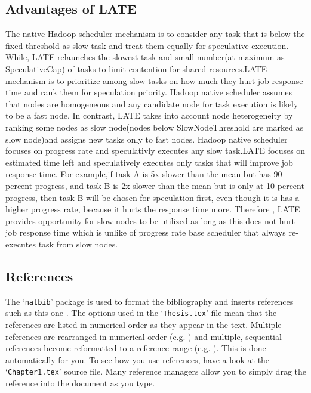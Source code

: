 \subsection{Advantages of LATE}

The native Hadoop scheduler mechanism is to consider any task that is below the fixed threshold as slow task and treat them equally for speculative execution. While, LATE relaunches the slowest task and small number(at maximum as SpeculativeCap) of tasks to limit contention for shared resources.LATE mechanism is to prioritize among slow tasks on how much they hurt job response time and rank them for speculation priority.
Hadoop native scheduler assumes that nodes are homogeneous and any candidate node for task execution is likely to be a fast node. In contrast, LATE takes into account node heterogeneity by ranking some nodes as slow node(nodes below SlowNodeThreshold are marked as slow node)and assigns new tasks only to fast nodes.
Hadoop native scheduler focuses on progress rate and speculativly executes any slow task.LATE focuses on estimated time left and speculatively executes only tasks that will improve job response time. For example,if task A is 5x slower than the mean but has 90 percent progress, and task B is 2x slower than the mean but is only at 10 percent progress, then task B will be chosen for speculation first, even though it is has a higher progress rate, because it hurts the response time more. Therefore , LATE provides opportunity for slow nodes to be utilized as long as this does not hurt job response time which is unlike of progress rate base scheduler that always re-executes task from slow nodes.      





\subsection{References}

The `\texttt{natbib}' package is used to format the bibliography and inserts references such as this one \citep{Reference3}. The options used in the `\texttt{Thesis.tex}' file mean that the references are listed in numerical order as they appear in the text. Multiple references are rearranged in numerical order (e.g. \citep{Reference2, Reference1}) and multiple, sequential references become reformatted to a reference range (e.g. \citep{Reference2, Reference1, Reference3}). This is done automatically for you. To see how you use references, have a look at the `\texttt{Chapter1.tex}' source file. Many reference managers allow you to simply drag the reference into the document as you type.

